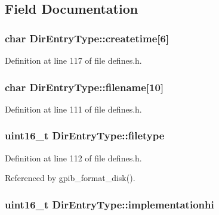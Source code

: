 \subsection{Field Documentation}
\subsubsection[{\texorpdfstring{createtime}{createtime}}]{\setlength{\rightskip}{0pt plus 5cm}char Dir\+Entry\+Type\+::createtime\mbox{[}6\mbox{]}}\hypertarget{structDirEntryType_a627fd55537c73d4fee596b140e106c01}{}\label{structDirEntryType_a627fd55537c73d4fee596b140e106c01}


Definition at line 117 of file defines.\+h.

\subsubsection[{\texorpdfstring{filename}{filename}}]{\setlength{\rightskip}{0pt plus 5cm}char Dir\+Entry\+Type\+::filename\mbox{[}10\mbox{]}}\hypertarget{structDirEntryType_aa60fae0a6b7ba9c966cbcf46e555f396}{}\label{structDirEntryType_aa60fae0a6b7ba9c966cbcf46e555f396}


Definition at line 111 of file defines.\+h.

\subsubsection[{\texorpdfstring{filetype}{filetype}}]{\setlength{\rightskip}{0pt plus 5cm}uint16\+\_\+t Dir\+Entry\+Type\+::filetype}\hypertarget{structDirEntryType_ada14562440087858ebf04bc4c81eedd2}{}\label{structDirEntryType_ada14562440087858ebf04bc4c81eedd2}


Definition at line 112 of file defines.\+h.



Referenced by gpib\+\_\+format\+\_\+disk().

\subsubsection[{\texorpdfstring{implementationhi}{implementationhi}}]{\setlength{\rightskip}{0pt plus 5cm}uint16\+\_\+t Dir\+Entry\+Type\+::implementationhi}\hypertarget{structDirEntryType_a27a15eea3264d44c9e93e3be77093151}{}\label{structDirEntryType_a27a15eea3264d44c9e93e3be77093151}


